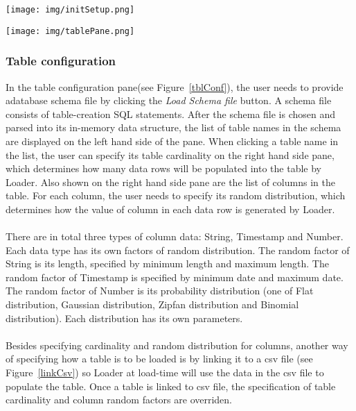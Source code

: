 \documentclass[a4paper,10pt]{article}
\begin{document}
\begin{figure*}
\centering
\begin{minipage}[t]{3.0in}
    \centering
    \texttt{[image: img/initSetup.png]}
    \caption{Initial benchmark configuration}
    \label{initConf}
\end{minipage}
\begin{minipage}{0.1in}
    \hspace*{0.1in}
\end{minipage}
\begin{minipage}[t]{3.0in}
    \centering
    \texttt{[image: img/tablePane.png]}
    \caption{Table configuration}
    \label{tblConf}
\end{minipage}

\end{figure*}

\subsubsection{Table configuration}
In the table configuration pane(see Figure~\ref{tblConf}), the user needs to provide adatabase schema file by clicking the \emph{Load Schema file} button. A schema file consists of table-creation SQL statements. After the schema file is chosen and parsed into its in-memory data structure, the list of table names in the schema are displayed on the left hand side of the pane. When clicking a table name in the list, the user can specify its table cardinality on the right hand side pane, which determines how many data rows will be populated into the table by Loader. Also shown on the right hand side pane are the list of columns in the table. For each column, the user needs to specify its random distribution, which determines how the value of column in each data row is generated by Loader.
\\\\
There are in total three types of column data: String, Timestamp and Number. Each data type has its own factors of random distribution. The random factor of String is its length, specified by minimum length and maximum length. The random factor of Timestamp is specified by minimum date and maximum date. The random factor of Number is its probability distribution (one of Flat distribution, Gaussian distribution, Zipfan distribution and Binomial distribution). Each distribution has its own parameters.
\\\\
Besides specifying cardinality and random distribution for columns, another way of specifying how a table is to be loaded is by linking it to a csv file (see Figure~\ref{linkCsv}) so Loader at load-time will use the data in the csv file to populate the table. Once a table is linked to csv file, the specification of table cardinality and column random factors are overriden.
\end{document}

